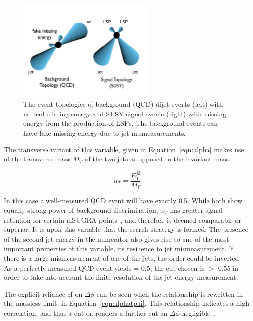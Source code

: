 \begin{figure}[htbp]
\centering
\includegraphics[width=0.6\textwidth]{Figures/AlphaT/forZ.pdf}
\caption{\label{fig:attop}The event topologies of background (QCD) dijet events (left) with no real missing energy and SUSY signal events (right) with missing energy from the production of LSPs. The background events can have fake missing energy due to jet mismeasurements.}
\end{figure}



The transverse variant of this variable, given in Equation~\ref{eqn:alpha} makes use of the transverse mass $M_{T}$ of the two jets as opposed to the invariant mass.

\begin{equation}
\alpha_{T} = \frac{E_{T}^{j2}}{M_{T}} 
\label{eqn:alphat}
\end{equation}

In this case a well-measured QCD event will have exactly 0.5. While both show equally strong power of background discrimination, $\alpha_{T}$ has greater signal retention for certain mSUGRA points~\cite{PASaT}, and therefore is deemed comparable or superior. It is upon this variable that the search strategy is formed. The presence of the second jet energy in the numerator also gives rise to one of the most important properties of this variable, its resilience to jet mismeasurement. If there is a large mismeasurement of one of the jets, the order could be inverted. As a perfectly measured QCD event yields \alt = 0.5, the cut chosen is \alt $>$ 0.55 in order to take into account the finite resolution of the jet energy measurement.  


The explicit reliance of \alt on $\Delta \phi$ can be seen when the relationship is rewritten in the massless limit, in Equation~\ref{eqn:alphatphi}. This relationship indicates a high correlation, and thus a cut on \alt renders a further cut on $\Delta \phi$ negligible~\cite{ANaT}.

